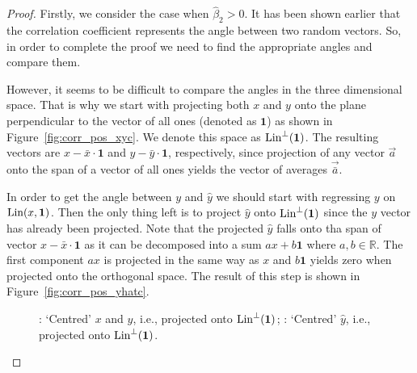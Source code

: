 \begin{proof}
Firstly, we consider the case when $\hat \beta_2 > 0$.
It has been shown earlier that the correlation coefficient represents the angle
between two random vectors.
So, in order to complete the proof we need to find the appropriate angles and compare them.

However, it seems to be difficult to compare the angles in the three dimensional space.
That is why we start with projecting both $x$ and $y$ onto the plane perpendicular to the vector of all ones (denoted as $\mathbf{1}$) as shown in Figure~\ref{fig:corr_pos_xyc}.
We denote this space as $\operatorname{Lin}^{\perp}(\mathbf{1})$. The resulting vectors are $x - \bar x \cdot \mathbf{1}$  and $y - \bar y \cdot \mathbf{1}$, respectively,
since projection of any vector $\vec{a}$ onto the span of a vector of all ones yields the vector of averages $\vec{\bar a}$.


In order to get the angle between $y$ and $\hat y$ we should start with regressing $y$ on $\operatorname{Lin}(x, \mathbf{1})$.
Then the only thing left is to project $\hat y$ onto $\operatorname{Lin}^{\perp}(\mathbf{1})$ since the $y$ vector has already been projected.
Note that the projected $\hat y$ falls onto tha span of vector $x - \bar x \cdot \mathbf{1}$ as it can be decomposed into a sum $a x + b \mathbf{1}$ where $a, b \in \mathbb{R}$.
The first component $a x$ is projected in the same way as $x$ and $b \mathbf{1}$ yields zero when projected onto the orthogonal space.
The result of this step is shown in Figure~\ref{fig:corr_pos_yhatc}.

\begin{figure}[h!]
\begin{center}
\caption{: `Centred' $x$ and $y$, i.e., projected onto $\operatorname{Lin}^{\perp}(\mathbf{1})$;
: `Centred' $\hat y$, i.e., projected onto $\operatorname{Lin}^{\perp}(\mathbf{1})$.}
\end{center}
\end{figure}


\end{proof}
